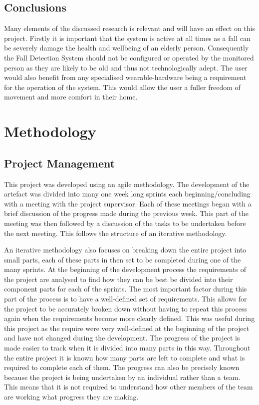 \documentclass[11pt,a4paper]{report}
\begin{document}
\section{Conclusions}
Many elements of the discussed research is relevant and will have an effect on this project. Firstly it is important that the system is active at all times as a fall can be severely damage the health and wellbeing of an elderly person. Consequently the Fall Detection System should not be configured or operated by the monitored person as they are likely to be old and thus not technologically adept. The user would also benefit from any specialised wearable-hardware being a requirement for the operation of the system. This would allow the user a fuller freedom of movement and more comfort in their home.

\chapter{Methodology}

\section{Project Management}
This project was developed using an agile methodology. The development of the artefact was divided into many one week long sprints each beginning/concluding with a meeting with the project supervisor. Each of these meetings began with a brief discussion of the progress made during the previous week. This part of the meeting was then followed by a discussion of the tasks to be undertaken before the next meeting. This follows the structure of an iterative methodology.

An iterative methodology also focuses on breaking down the entire project into small parts, each of these parts in then set to be completed during one of the many sprints. At the beginning of the development process the requirements of the project are analysed to find how they can be best be divided into their component parts for each of the sprints. The most important factor during this part of the process is to have a well-defined set of requirements. This allows for the project to be accurately broken down without having to repeat this process again when the requirements become more clearly defined. This was useful during this project as the require were very well-defined at the beginning of the project and have not changed during the development. The progress of the project is made easier to track when it is divided into many parts in this way. Throughout the entire project it is known how many parts are left to complete and what is required to complete each of them. The progress can also be precisely known because the project is being undertaken by an individual rather than a team. This means that it is not required to understand how other members of the team are working what progress they are making.
\end{document}

